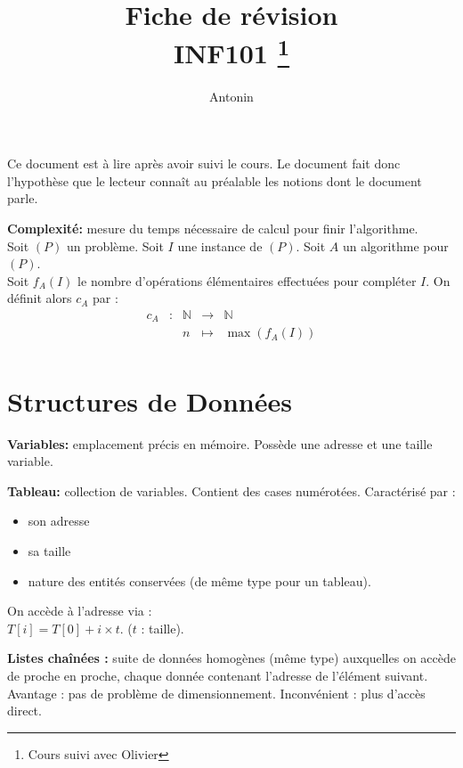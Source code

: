\documentclass[a4paper, 8pt]{article}
\title{\sffamily\textbf{Fiche de révision \\ INF101} \thanks{Cours suivi avec Olivier \bsc{Hudry} }}
\author{Antonin \bsc{Godard}}
\date{}
\begin{document}
\begin{multicols*}{3}
\setlength{\parindent}{0pt}
\maketitle

\begin{changemargin}{0.5cm}{0.5cm} 
{\footnotesize Ce document est à lire après avoir suivi le cours. Le document fait donc l'hypothèse que le lecteur connaît au préalable les notions dont le document parle.}
\end{changemargin}


\textbf{Complexité:} mesure du temps nécessaire de calcul pour finir l'algorithme.\\ Soit $(P)$ un problème. Soit $I$ une instance de $(P)$. Soit $A$ un algorithme pour $(P)$.\\ Soit $f_A(I)$ le nombre d'opérations élémentaires effectuées pour compléter $I$. On définit alors $c_A$ par :
\[
\begin{array}{cc|ccl}
c_A & : & \mathbb{N} & \to & \mathbb{N} \\
 & & n & \mapsto & \max(f_A(I)) \\
\end{array}
\]

\section*{Structures de Données}

\textbf{Variables:} emplacement précis en mémoire. Possède une adresse et une taille variable.

\textbf{Tableau:} collection de variables. Contient des cases numérotées. Caractérisé par :\begin{itemize}
\item son adresse
\item sa taille
\item nature des entités conservées (de même type pour un tableau).
\end{itemize}
On accède à l'adresse via :\\ $ T\left[ i\right] = T\left[ 0\right] + i\times t $. ($t$ : taille).

\textbf{Listes chaînées :} suite de données homogènes (même type) auxquelles on accède de proche en proche, chaque donnée contenant l'adresse de l'élément suivant. Avantage : pas de problème de dimensionnement. Inconvénient : plus d'accès direct.


\end{multicols*}
\end{document}
